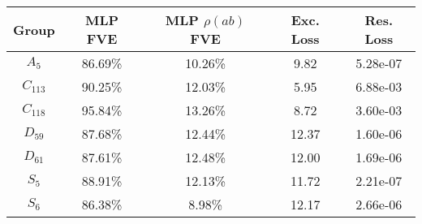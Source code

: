 \begin{tabular}{ccccc}
\toprule
    Group & MLP FVE & MLP $\rho(ab)$ FVE & Exc. Loss & Res. Loss \\
\midrule
  $A_{5}$ & 86.69\% &            10.26\% &      9.82 &  5.28e-07 \\
$C_{113}$ & 90.25\% &            12.03\% &      5.95 &  6.88e-03 \\
$C_{118}$ & 95.84\% &            13.26\% &      8.72 &  3.60e-03 \\
 $D_{59}$ & 87.68\% &            12.44\% &     12.37 &  1.60e-06 \\
 $D_{61}$ & 87.61\% &            12.48\% &     12.00 &  1.69e-06 \\
  $S_{5}$ & 88.91\% &            12.13\% &     11.72 &  2.21e-07 \\
  $S_{6}$ & 86.38\% &             8.98\% &     12.17 &  2.66e-06 \\
\bottomrule
\end{tabular}
